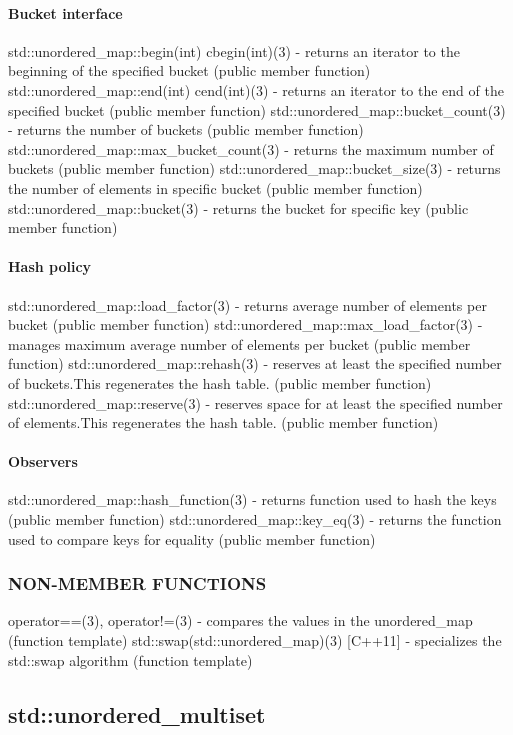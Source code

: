 \paragraph{Bucket interface}
std::unordered\_map::begin(int) cbegin(int)(3) - returns an iterator to the beginning of the specified bucket   (public member function)
std::unordered\_map::end(int) cend(int)(3) - returns an iterator to the end of the specified bucket   (public member function)
std::unordered\_map::bucket\_count(3) - returns the number of buckets  (public member function)
std::unordered\_map::max\_bucket\_count(3) - returns the maximum number of buckets  (public member function)
std::unordered\_map::bucket\_size(3) - returns the number of elements in specific bucket  (public member function)
std::unordered\_map::bucket(3) - returns the bucket for specific key  (public member function)
\paragraph{Hash policy}
std::unordered\_map::load\_factor(3) - returns average number of elements per bucket  (public member function)
std::unordered\_map::max\_load\_factor(3) - manages maximum average number of elements per bucket  (public member function)
std::unordered\_map::rehash(3) - reserves at least the specified number of buckets.This regenerates the hash table.  (public member function)
std::unordered\_map::reserve(3) - reserves space for at least the specified number of elements.This regenerates the hash table.  (public member function)
\paragraph{Observers}
std::unordered\_map::hash\_function(3) - returns function used to hash the keys   (public member function)
std::unordered\_map::key\_eq(3) - returns the function used to compare keys for equality   (public member function)

\subsubsection{NON-MEMBER FUNCTIONS}
operator==(3), operator!=(3) - compares the values in the unordered\_map   (function template)
std::swap(std::unordered\_map)(3) [C++11] - specializes the std::swap algorithm   (function template)


\subsection{std::unordered\_multiset}

